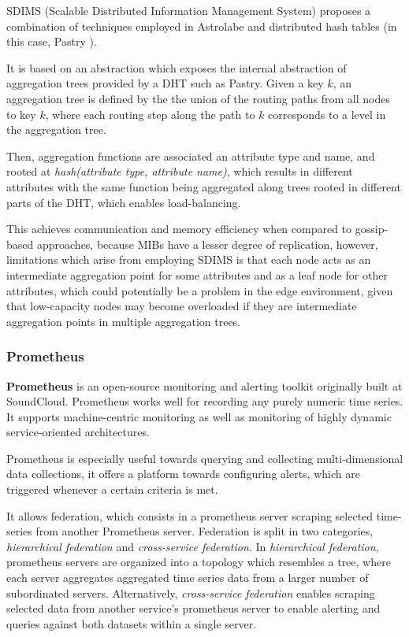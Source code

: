 SDIMS \cite{SDIMS} (Scalable Distributed Information Management System) proposes a combination of techniques employed in Astrolabe \cite{Renesse2003} and distributed hash tables (in this case, Pastry \cite{rowstron2001pastry}).

It is based on an abstraction which exposes the internal abstraction of aggregation trees provided by a DHT such as Pastry. Given a key $k$, an aggregation tree is defined by the the union of the routing paths from all nodes to key $k$, where each routing step along the path to $k$ corresponds to a level in the aggregation tree.

Then, aggregation functions are associated an attribute type and name, and rooted at \textit{hash(attribute type, attribute name)}, which results in different attributes with the same function being aggregated along trees rooted in different parts of the DHT, which enables load-balancing.

This achieves communication and memory efficiency when compared to gossip-based approaches, because MIBs have a lesser degree of replication, however, limitations which arise from employing SDIMS is that each node acts as an intermediate aggregation point for some attributes and as a leaf node for other attributes, which could potentially be a problem in the edge environment, given that low-capacity nodes may become overloaded if they are intermediate aggregation points in multiple aggregation trees. 

\subsubsection{Prometheus}

\textbf{Prometheus} \cite{prometheus} is an open-source monitoring and alerting toolkit originally built at SoundCloud. Prometheus works well for recording any purely numeric time series. It supports machine-centric monitoring as well as monitoring of highly dynamic service-oriented architectures. 

Prometheus is especially useful towards querying and collecting multi-dimensional data collections, it offers a platform towards configuring alerts, which are triggered whenever a certain criteria is met. 

It allows federation, which consists in a prometheus server scraping selected time-series from another Prometheus server. Federation is split in two categories, \textit{hierarchical federation} and \textit{cross-service federation}. In \textit{hierarchical federation}, prometheus servers are organized into a topology which resembles a tree, where each server aggregates aggregated time series data from a larger number of subordinated servers. Alternatively,  \textit{cross-service federation} enables scraping selected data from another service's prometheus server to enable alerting and queries against both datasets within a single server. 

